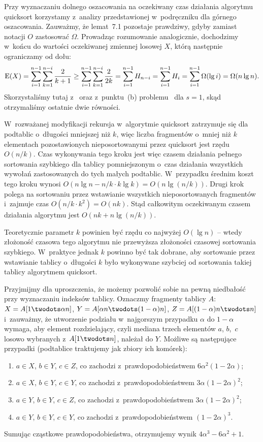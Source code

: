 \exercise %
Przy wyznaczaniu dolnego oszacowania na oczekiwany czas działania algorytmu quicksort korzystamy z~analizy przedstawionej w~podręczniku dla górnego oszacowania. Zauważmy, że lemat~7.1 pozostaje prawdziwy, gdyby zamiast notacji $O$ zastosować $\Omega$. Prowadząc rozumowanie analogicznie, dochodzimy w~końcu do wartości oczekiwanej zmiennej losowej $X$, którą następnie ograniczamy od dołu:
\[
	\operatorname{E}(X) = \sum_{i=1}^{n-1}\sum_{k=1}^{n-i}\frac{2}{k+1} \ge \sum_{i=1}^{n-1}\sum_{k=1}^{n-i}\frac{2}{2k} = \sum_{i=1}^{n-1}H_{n-i} = \sum_{i=1}^{n-1}H_i = \sum_{i=1}^{n-1}\Omega(\lg i) = \Omega(n\lg n).
\]
Skorzystaliśmy tutaj z~ oraz z~punktu~(b) problemu~ dla $s=1$, skąd otrzymaliśmy ostatnie dwie równości.

\exercise %
W~rozważanej modyfikacji rekursja w~algorytmie quicksort zatrzymuje się dla podtablic o~długości mniejszej niż $k$, więc liczba fragmentów o~mniej niż $k$ elementach pozostawionych nieposortowanymi przez quicksort jest rzędu $O(n/k)$. Czas wykonywania tego kroku jest więc czasem działania pełnego sortowania szybkiego dla tablicy  pomniejszonym o~czas działania wszystkich wywołań zastosowanych do tych małych podtablic. W~przypadku średnim koszt tego kroku wynosi $O(n\lg n-n/k\cdot k\lg k)=O(n\lg(n/k))$. Drugi krok polega na sortowaniu przez wstawianie wszystkich nieposortowanych fragmentów i~zajmuje czas $O(n/k\cdot k^2)=O(nk)$. Stąd całkowitym oczekiwanym czasem działania algorytmu jest $O(nk+n\lg(n/k))$.

Teoretycznie parametr $k$ powinien być rzędu co najwyżej $O(\lg n)$ -- wtedy złożoność czasowa tego algorytmu nie przewyższa złożoności czasowej sortowania szybkiego. W~praktyce jednak $k$ powinno być tak dobrane, aby sortowanie przez wstawianie tablicy o~długości $k$ było wykonywane szybciej od sortowania takiej tablicy algorytmem quicksort.

\exercise %
Przyjmijmy dla uproszczenia, że możemy pozwolić sobie na pewną niedbałość przy wyznaczaniu indeksów tablicy. Oznaczmy fragmenty tablicy $A$: $X=A[1\twodots\alpha n]$, $Y=A[\alpha n\twodots(1-\alpha)n]$, $Z=A[(1-\alpha)n\twodots n]$ i~zauważmy, że utworzenie podziału w~najgorszym przypadku $\alpha$ do $1-\alpha$ wymaga, aby element rozdzielający, czyli mediana trzech elementów $a$, $b$,~$c$ losowo wybranych z~$A[1\twodots n]$, należał do $Y$. Możliwe są następujące przypadki (podtablice traktujemy jak zbiory ich komórek):
\begin{enumerate}
	\item $a\in X$, $b\in Y$, $c\in Z$, co zachodzi z~prawdopodobieństwem $6\alpha^2(1-2\alpha)$;
	\item $a\in X$, $b\in Y$, $c\in Y$, co zachodzi z~prawdopodobieństwem $3\alpha(1-2\alpha)^2$;
	\item $a\in Y$, $b\in Y$, $c\in Z$, co zachodzi z~prawdopodobieństwem $3\alpha(1-2\alpha)^2$;
	\item $a\in Y$, $b\in Y$, $c\in Y$, co zachodzi z~prawdopodobieństwem $(1-2\alpha)^3$.
\end{enumerate}
Sumując cząstkowe prawdopodobieństwa, otrzymujemy wynik $4\alpha^3-6\alpha^2+1$.

